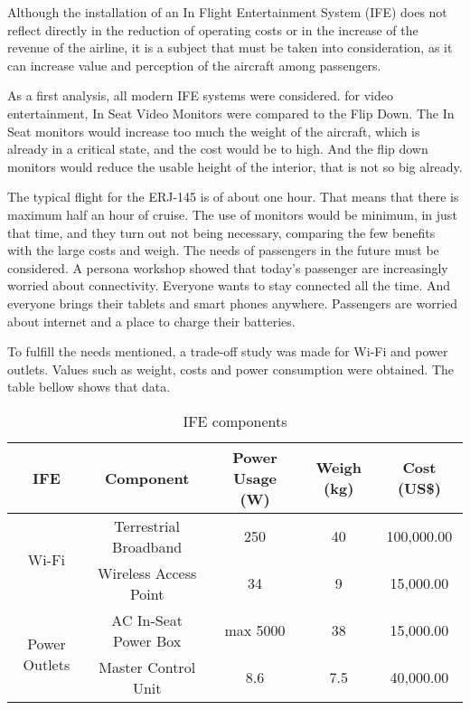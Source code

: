 Although the installation of an In Flight Entertainment System (IFE) does not reflect directly in the reduction of operating costs or in the increase of the revenue of the airline, it is a subject that must be taken into consideration, as it can increase value and perception of the aircraft among passengers.

As a first analysis, all modern IFE systems were considered. for video entertainment, In Seat Video Monitors were compared to the Flip Down. The In Seat monitors would increase too much the weight of the aircraft, which is already in a critical state, and the cost would be to high. And the flip down monitors would reduce the usable height of the interior, that is not so big already.

The typical flight for the ERJ-145 is of about one hour. That means that there is maximum half an hour of cruise. The use of monitors would be minimum, in just that time, and they turn out not being necessary, comparing the few benefits with the large costs and weigh.
The needs of passengers in the future must be considered. A persona workshop showed that today's passenger are increasingly worried about connectivity. Everyone wants to stay connected all the time. And everyone brings their tablets and smart phones anywhere. Passengers are worried about internet and a place to charge their batteries.

To fulfill the needs mentioned, a trade-off study was made for Wi-Fi and power outlets. Values such as weight, costs and power consumption were obtained. The table bellow shows that data.

\begin{table}[htbp]
  \centering
  \caption{IFE components}
    \begin{tabular}{ccccc}
    \toprule
    \textbf{IFE} & \textbf{Component} & \textbf{Power Usage (W)} & \textbf{Weigh (kg)} & \textbf{Cost (US\$)} \\
    \midrule
    \multirow{2}[1]{*}{Wi-Fi} & Terrestrial Broadband & 250   & 40    & 100,000.00 \\
          & Wireless Access Point & 34    & 9     & 15,000.00 \\
    \multirow{2}[1]{*}{Power Outlets} & AC In-Seat Power Box  & max 5000 & 38    & 15,000.00 \\
          & Master Control Unit & 8.6   & 7.5   & 40,000.00 \\
    \bottomrule
    \end{tabular}%
  \label{tab:ifecomponents}%
\end{table}%

